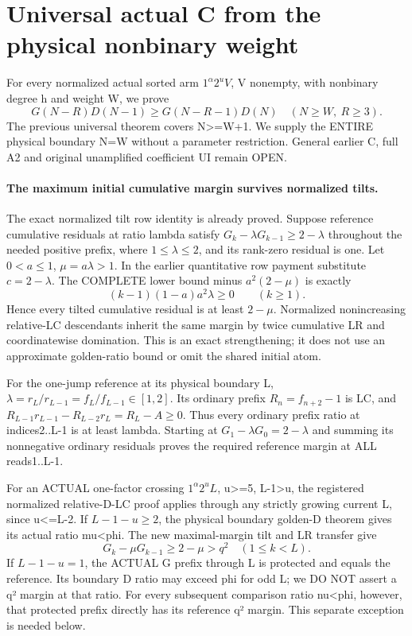 \section{Universal actual C from the physical nonbinary weight}
For every normalized actual sorted arm $1^\alpha2^uV$, V nonempty,
with nonbinary degree h and weight W, we prove
\[
 G(N-R)D(N-1)\ge G(N-R-1)D(N)
                         \quad(N\ge W,\ R\ge3).       \tag{1}
\]
The previous universal theorem covers N>=W+1. We supply the
ENTIRE physical boundary N=W without a parameter restriction.
General earlier C, full A2 and original unamplified coefficient UI remain OPEN.

\paragraph{The maximum initial cumulative margin survives normalized tilts.}
The exact normalized tilt row identity is already proved.
Suppose reference cumulative residuals at ratio lambda satisfy
$G_k-\lambda G_{k-1}\ge2-\lambda$ throughout the needed positive prefix,
where $1\le\lambda\le2$, and its rank-zero residual is one.
Let $0<a\le1$, $\mu=a\lambda>1$.
In the earlier quantitative row payment substitute $c=2-\lambda$.
The COMPLETE lower bound minus $a^2(2-\mu)$ is exactly
\[
                         (k-1)(1-a)a^2\lambda\ge0
                                               \qquad(k\ge1).
\]
Hence every tilted cumulative residual is at least $2-\mu$.
Normalized nonincreasing relative-LC descendants inherit the same
margin by twice cumulative LR and coordinatewise domination.
This is an exact strengthening; it does not use an approximate
golden-ratio bound or omit the shared initial atom.

For the one-jump reference at its physical boundary L,
$\lambda=r_L/r_{L-1}=f_L/f_{L-1}\in[1,2]$.
Its ordinary prefix $R_n=f_{n+2}-1$ is LC, and
$R_{L-1}r_{L-1}-R_{L-2}r_L=R_L-A\ge0$.
Thus every ordinary prefix ratio at indices2..L-1 is at least lambda.
Starting at $G_1-\lambda G_0=2-\lambda$ and summing its nonnegative
ordinary residuals proves the required reference margin at ALL reads1..L-1.

For an ACTUAL one-factor crossing $1^\alpha2^uL$, u>=5, L-1>u,
the registered normalized relative-D-LC proof applies through any
strictly growing current L, since u<=L-2.
If $L-1-u\ge2$, the physical boundary golden-D theorem gives its
actual ratio mu<phi. The new maximal-margin tilt and LR transfer give
\[
                         G_k-\mu G_{k-1}\ge2-\mu>q^2
                                                  \quad(1\le k<L).
                                                                  \tag{2}
\]
If $L-1-u=1$, the ACTUAL G prefix through L is protected and equals
the reference. Its boundary D ratio may exceed phi for odd L;
we DO NOT assert a q² margin at that ratio. For every subsequent
comparison ratio nu<phi, however, that protected prefix directly
has its reference q² margin. This separate exception is needed below.

